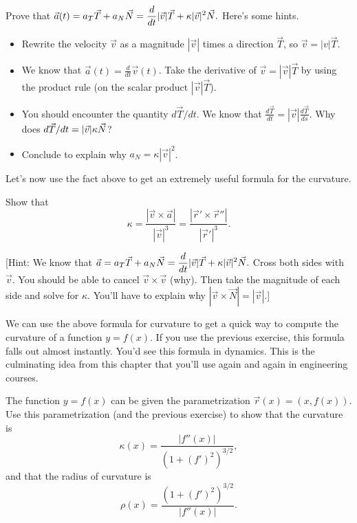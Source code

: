 \begin{challenge}%
 Prove that $\displaystyle \vec a(t) = a_T\vec T+a_N\vec N=\frac{d}{dt}|\vec v| \vec T + \kappa |\vec v|^2 \vec N.$ Here's some hints.
\begin{itemize}
 \item Rewrite the velocity $\vec v$ as a magnitude $|\vec v|$ times a direction $\vec T$, so $\vec v = |v|\vec T$.  
 \item We know that $\vec a(t) = \frac{d}{dt}\vec v(t)$. Take the derivative of $\vec v = |\vec v|\vec T$ by using the product rule (on the scalar product $|\vec v|\vec T$).
 \item You should encounter the quantity $d\vec T/dt$. We know that $\frac{d\vec T}{dt} = |\vec v|\frac{d\vec T}{ds}$. Why does $\displaystyle d\vec T/dt=|\vec v|\kappa\vec N$?
 \item Conclude to explain why $a_N =\kappa |\vec v|^2$.
\end{itemize}
\end{challenge}

Let's now use the fact above to get an extremely useful formula for the curvature. 

\begin{challenge}
Show that $$\kappa = \frac{|\vec v\times \vec a|}{|\vec v|^3} = \frac{|\vec r'\times \vec r''|}{|\vec r'|^3}.$$

[Hint: We know that $\displaystyle \vec a = a_T\vec T+a_N\vec N=\frac{d}{dt}|\vec v| \vec T + \kappa |\vec v|^2 \vec N.$  
Cross both sides with $\vec v$. You should be able to cancel $\vec v\times \vec v$ (why). Then take the magnitude of each side and solve for $\kappa$. You'll have to explain why $|\vec v\times \vec N| = |\vec v|$.]
\end{challenge}

We can use the above formula for curvature to get a quick way to compute the curvature of a function $y=f(x)$. If you use the previous exercise, this formula falls out almost instantly. You'd see this formula in dynamics. This is the culminating idea from this chapter that you'll use again and again in engineering courses.

\begin{challenge}\label{formula for curvature}
%
 The function $y=f(x)$ can be given the parametrization  $\vec r(x) = (x,f(x))$.  Use this parametrization (and the previous exercise) to show that the curvature is 
$$\kappa(x) = \frac{|f''(x)|}{(1+(f')^2)^{3/2}},$$ 
and that the radius of curvature is
$$\rho(x) = \frac{(1+(f')^2)^{3/2}}{|f''(x)|}.$$ 
\end{challenge}





